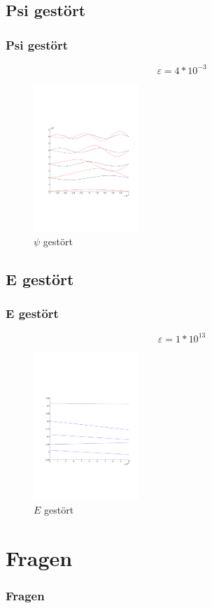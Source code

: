 \documentclass[aspectratio=169]{beamer}
\begin{document}
\subsection{ Psi gest\"ort }
\begin{frame}
  \frametitle{ Psi gest\"ort }
  \[
    \varepsilon = 4*10^{-3}
  \]
  \begin{figure}
    \centering
    \includegraphics[height=5.6cm,clip=true,trim=2cm 7cm 1cm 8cm]{../../skript/efeld/Psi_gestoert.pdf}
    \caption{$\psi$ gest\"ort}
    \label{abb:efeld_psi_gestoert}
  \end{figure}

\end{frame}

\subsection{ E gest\"ort }
\begin{frame}
  \frametitle{ E gest\"ort }
  \[
    \varepsilon = 1*10^{13}
  \]
  \begin{figure}
    \centering
    \includegraphics[height=5.6cm,clip=true,trim=2cm 7cm 1cm 8cm]{../../skript/efeld/Energie_gestoert.pdf}
    \caption{$E$ gest\"ort}
    \label{abb:efeld_E_gestoert}
  \end{figure}

\end{frame}




\section{ Fragen }
\begin{frame}
  \frametitle{ Fragen }
\end{frame}
\end{document}
